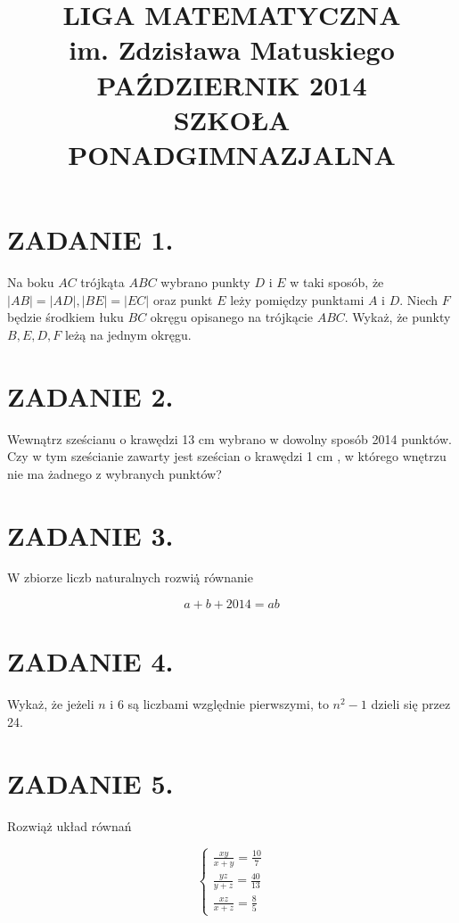 \documentclass[10pt]{article}
\title{LIGA MATEMATYCZNA \\
 im. Zdzisława Matuskiego \\
 PAŹDZIERNIK 2014 \\
 SZKOŁA PONADGIMNAZJALNA }
\author{}
\date{}
\begin{document}
\maketitle
\section*{ZADANIE 1.}
Na boku \(A C\) trójkąta \(A B C\) wybrano punkty \(D\) i \(E\) w taki sposób, że \(|A B|=|A D|,|B E|=|E C|\) oraz punkt \(E\) leży pomiędzy punktami \(A\) i \(D\). Niech \(F\) będzie środkiem łuku \(B C\) okręgu opisanego na trójkącie \(A B C\). Wykaż, że punkty \(B, E, D, F\) leżą na jednym okręgu.

\section*{ZADANIE 2.}
Wewnątrz sześcianu o krawędzi 13 cm wybrano w dowolny sposób 2014 punktów. Czy w tym sześcianie zawarty jest sześcian o krawędzi 1 cm , w którego wnętrzu nie ma żadnego z wybranych punktów?

\section*{ZADANIE 3.}
W zbiorze liczb naturalnych rozwią̇̇ równanie

\[
a+b+2014=a b
\]

\section*{ZADANIE 4.}
Wykaż, że jeżeli \(n\) i 6 są liczbami względnie pierwszymi, to \(n^{2}-1\) dzieli się przez 24.

\section*{ZADANIE 5.}
Rozwiąż układ równań

\[
\left\{\begin{array}{l}
\frac{x y}{x+y}=\frac{10}{7} \\
\frac{y z}{y+z}=\frac{40}{13} \\
\frac{x z}{x+z}=\frac{8}{5}
\end{array}\right.
\]
\end{document}
